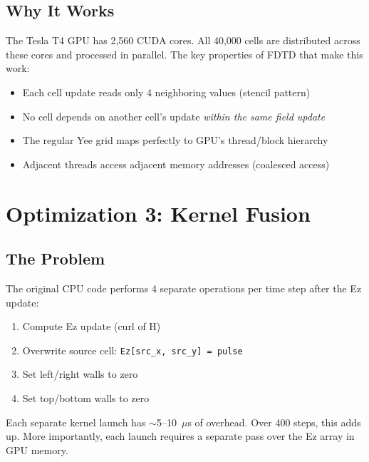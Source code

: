 \documentclass[11pt,a4paper]{article}
\begin{document}
\subsection{Why It Works}

\begin{tcolorbox}[colback=green!3, colframe=okgreen, title=\textbf{Fix \#2: Massive parallelism}]
The Tesla T4 GPU has 2,560 CUDA cores. All 40,000 cells are distributed across these cores and processed in parallel. The key properties of FDTD that make this work:
\begin{itemize}[nosep]
    \item Each cell update reads only 4 neighboring values (stencil pattern)
    \item No cell depends on another cell's update \emph{within the same field update}
    \item The regular Yee grid maps perfectly to GPU's thread/block hierarchy
    \item Adjacent threads access adjacent memory addresses (coalesced access)
\end{itemize}
\end{tcolorbox}


\section{Optimization 3: Kernel Fusion}

\subsection{The Problem}

\begin{tcolorbox}[colback=red!3, colframe=warnred, title=\textbf{Bottleneck \#3: Multiple kernel launches}]
The original CPU code performs 4 separate operations per time step after the Ez update:
\begin{enumerate}[nosep]
    \item Compute Ez update (curl of H)
    \item Overwrite source cell: \texttt{Ez[src\_x, src\_y] = pulse}
    \item Set left/right walls to zero
    \item Set top/bottom walls to zero
\end{enumerate}
Each separate kernel launch has $\sim$5--10~$\mu$s of overhead. Over 400 steps, this adds up. More importantly, each launch requires a separate pass over the Ez array in GPU memory.
\end{tcolorbox}
\end{document}
